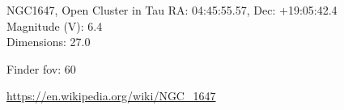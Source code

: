 \begin{block}{NGC1647, Open Cluster in Tau}
    RA: 04:45:55.57, Dec: +19:05:42.4 \\ 
    Magnitude (V): 6.4 \\ 
    Dimensions: 27.0 

    Finder fov: 60 

    \url{https://en.wikipedia.org/wiki/NGC_1647} 
\end{block}